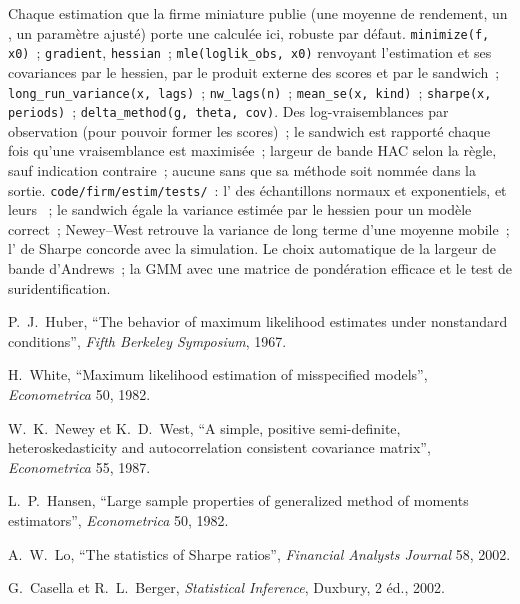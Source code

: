 \begin{build}
 Chaque estimation que la firme miniature publie (une moyenne de rendement, un , un paramètre ajusté) porte une
 calculée ici, robuste par défaut.
 \texttt{minimize(f, x0)}~; \texttt{gradient}, \texttt{hessian}~; \texttt{mle(loglik\_obs, x0)} renvoyant
l'estimation et ses covariances par le hessien, par le produit externe des scores et par le sandwich~; \texttt{long\_run\_variance(x, lags)}~; \texttt{nw\_lags(n)}~;
\texttt{mean\_se(x, kind)}~; \texttt{sharpe(x, periods)}~; \texttt{delta\_method(g, theta, cov)}.
 Des log-vraisemblances par observation (pour pouvoir former les scores)~; le sandwich est rapporté chaque fois qu'une vraisemblance est
maximisée~; largeur de bande HAC selon la règle, sauf indication contraire~; aucune  sans que sa méthode soit nommée dans la sortie.
 \texttt{code/firm/estim/tests/}~: l' des échantillons normaux et exponentiels, et leurs ~;
le sandwich égale la variance estimée par le hessien pour un modèle correct~; Newey--West retrouve la variance de long terme d'une moyenne mobile~;
l' de Sharpe concorde avec la simulation.
 Le choix automatique de la largeur de bande d'Andrews~; la GMM avec une matrice de pondération efficace et le test de suridentification.
\end{build}

\begin{omsources}
\item P.~J.~Huber, ``The behavior of maximum likelihood estimates under nonstandard conditions'', \emph{Fifth Berkeley
Symposium}, 1967.
\item H.~White, ``Maximum likelihood estimation of misspecified models'', \emph{Econometrica} 50, 1982.
\item W.~K.~Newey et K.~D.~West, ``A simple, positive semi-definite, heteroskedasticity and autocorrelation consistent covariance
matrix'', \emph{Econometrica} 55, 1987.
\item L.~P.~Hansen, ``Large sample properties of generalized method of moments estimators'', \emph{Econometrica} 50, 1982.
\item A.~W.~Lo, ``The statistics of Sharpe ratios'', \emph{Financial Analysts Journal} 58, 2002.
\item G.~Casella et R.~L.~Berger, \emph{Statistical Inference}, Duxbury, 2 éd., 2002.
\end{omsources}


